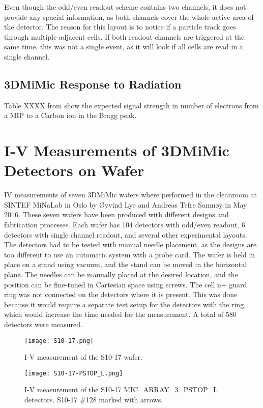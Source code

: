 \documentclass[../main/thesis.tex]{subfiles}
\begin{document}
Even though the odd/even readout scheme contains two channels, it does not provide any spacial information, as both channels cover the whole active area of the detector. The reason for this layout is to notice if a particle track goes through multiple adjacent cells. If both readout channels are triggered at the same time, this was not a single event, as it will look if all cells are read in a single channel.

\subsection{3DMiMic Response to Radiation}
Table XXXX from \citep{Samnoy} show the expected signal strength in number of electrons from a \gls{MIP} to a Carbon ion in the Bragg peak. 

\section{I-V Measurements of 3DMiMic Detectors on Wafer}
\label{3d-IV}
\gls{IV} measurements of seven 3DMiMic wafers where performed in the cleanroom at SINTEF MiNaLab in Oslo by Øyvind Lye and Andreas Tefre Samnøy in May 2016. These seven wafers have been produced with different designs and fabrication processes. Each wafer has 104 detectors with odd/even readout, 6 detectors with single channel readout, and several other experimental layouts. The detectors had to be tested with manual needle placement, as the designs are too different to use an automatic system with a probe card. The wafer is held in place on a stand using vacuum, and the stand can be moved in the horizontal plane. The needles can be manually placed at the desired location, and the position can be fine-tuned in Cartesian space using screws. The cell n+ guard ring was not connected on the detectors where it is present. This was done because it would require a separate test setup for the detectors with the ring, which would increase the time needed for the measurement. A total of 580 detectors were measured. 

\begin{figure}%
	\centering
	\texttt{[image: S10-17.png]}
	\caption{I-V measurement of the S10-17 wafer. }
	\label{fig-3d-S10-17} 
\end{figure}

\begin{figure}%
	\centering
	\texttt{[image: S10-17-PSTOP\_L.png]}
	\caption{I-V measurement of the S10-17 MIC\_ARRAY\_3\_PSTOP\_L detectors. S10-17 \#128 marked with arrows.}
	\label{fig-3d-S10-17-PSTOP_L} 
\end{figure}
\end{document}
